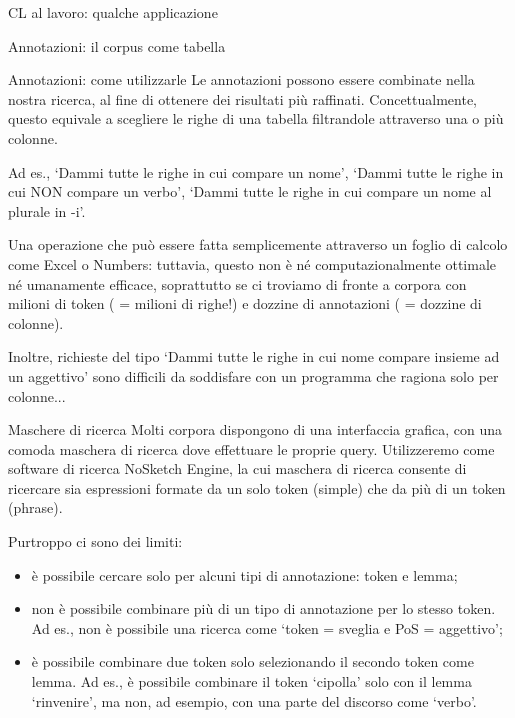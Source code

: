 \documentclass[pdf]{prosper}
\begin{document}
\begin{tsectionandpart}{CL al lavoro: qualche applicazione}
\begin{slide}{Annotazioni: il corpus come tabella}
\end{slide}

\begin{slide}{Annotazioni: come utilizzarle}
Le annotazioni possono essere combinate nella nostra ricerca, al fine di ottenere dei risultati più raffinati.
Concettualmente, questo equivale a scegliere le righe di una tabella filtrandole attraverso una o più colonne.

Ad es., `Dammi tutte le righe in cui compare un nome', `Dammi tutte le righe in cui NON compare un verbo', `Dammi tutte le righe in cui compare un nome al plurale in -i'.

Una operazione che può essere fatta semplicemente attraverso un foglio di calcolo come Excel o Numbers: tuttavia, questo non è né computazionalmente ottimale né umanamente efficace, soprattutto se ci troviamo di fronte a corpora con milioni di token ( = milioni di righe!) e dozzine di annotazioni ( = dozzine di colonne).

Inoltre, richieste del tipo `Dammi tutte le righe in cui nome compare insieme ad un aggettivo' sono difficili da soddisfare con un programma che ragiona solo per colonne...

\end{slide}

\begin{slide}{Maschere di ricerca}
	Molti corpora dispongono di una interfaccia grafica, con una comoda maschera di ricerca dove effettuare le proprie query. Utilizzeremo come software di ricerca NoSketch Engine, la cui maschera di ricerca consente di ricercare sia espressioni formate da un solo token (simple) che da più di un token (phrase).

Purtroppo ci sono dei limiti:

\begin{itemize}
\item è possibile cercare solo per alcuni tipi di annotazione: token e lemma;
\item non è possibile combinare più di un tipo di annotazione per lo stesso token. Ad es., non è possibile una ricerca come `token = sveglia e PoS = aggettivo';
\item è possibile combinare due token solo selezionando il secondo token come lemma. Ad es., è possibile combinare il token `cipolla' solo con il lemma `rinvenire', ma non, ad esempio, con una parte del discorso come `verbo'.
\end{itemize}
\end{slide}


\end{tsectionandpart}
\end{document}
